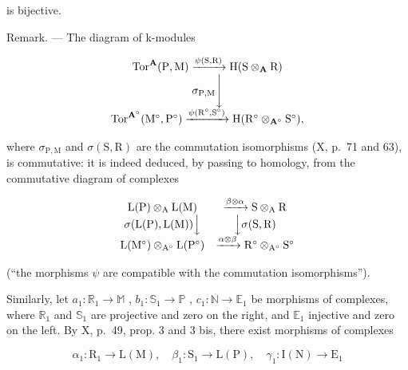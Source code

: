 is bijective.

Remark. --- The diagram of k-modules

\[
\begin{array}{c} \operatorname{Tor} ^ {\mathbf {A}} (\mathrm{P}, \mathrm{M}) \xrightarrow {\psi (\mathrm{S} , \mathrm{R})} \mathrm{H} (\mathrm{S} \otimes_ {\mathbf {A}} \mathrm{R}) \\ \sigma_ {\mathrm{P}, \mathrm{M}} \Biggl \downarrow \\ \operatorname{Tor} ^ {\mathbf {A} ^ {\circ}} (\mathrm{M} ^ {\circ}, \mathrm{P} ^ {\circ}) \xrightarrow {\psi (\mathrm{R} ^ {\circ} , \mathrm{S} ^ {\circ})} \mathrm{H} (\mathrm{R} ^ {\circ} \otimes_ {\mathbf {A} ^ {\circ}} \mathrm{S} ^ {\circ}), \end{array}
\]

where \(\sigma_{\mathrm{P,M}}\) and \(\sigma(\mathrm{S},\mathrm{R})\) are the commutation isomorphisms (X, p.~71 and 63), is commutative: it is indeed deduced, by passing to homology, from the commutative diagram of complexes

\[
\begin{array}{c c} \mathrm{L} (\mathrm{P}) \otimes_ {\mathrm{A}} \mathrm{L} (\mathrm{M}) & \xrightarrow {\beta \otimes \alpha} \mathrm{S} \otimes_ {\mathrm{A}} \mathrm{R} \\ \sigma (\mathrm{L} (\mathrm{P}), \mathrm{L} (\mathrm{M})) \Big \downarrow & \Big \downarrow \sigma (\mathrm{S}, \mathrm{R}) \\ \mathrm{L} (\mathrm{M} ^ {\circ}) \otimes_ {\mathrm{A} ^ {\circ}} \mathrm{L} (\mathrm{P} ^ {\circ}) & \xrightarrow {\alpha \otimes \beta} \mathrm{R} ^ {\circ} \otimes_ {\mathrm{A} ^ {\circ}} \mathrm{S} ^ {\circ} \end{array}
\]

(“the morphisms \(\psi\) are compatible with the commutation isomorphisms”).

Similarly, let \(a_{1}: \mathbb{R}_{1} \to \mathbb{M}\) , \(b_{1}: \mathbb{S}_{1} \to \mathbb{P}\) , \(c_{1}: \mathbb{N} \to \mathbb{E}_{1}\) be morphisms of complexes, where \(\mathbb{R}_{1}\) and \(\mathbb{S}_{1}\) are projective and zero on the right, and \(\mathbb{E}_{1}\) injective and zero on the left. By X, p.~49, prop. 3 and 3 bis, there exist morphisms of complexes

\[
\alpha_ {1}: \mathrm{R} _ {1} \rightarrow \mathrm{L} (\mathrm{M}), \quad \beta_ {1}: \mathrm{S} _ {1} \rightarrow \mathrm{L} (\mathrm{P}), \quad \gamma_ {1}: \mathrm{I} (\mathrm{N}) \rightarrow \mathrm{E} _ {1}
\]

